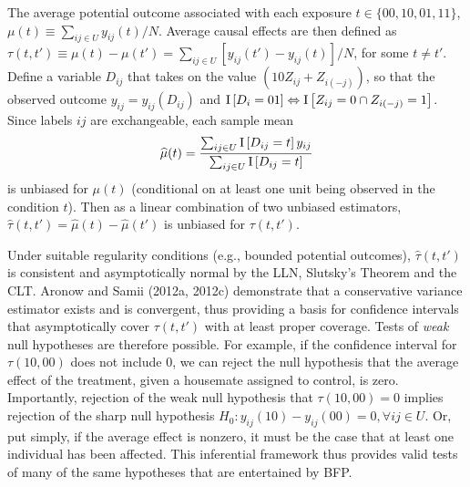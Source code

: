 \documentclass[12pt]{article}
\newcommand{\I}{{\rm I}}
\newcommand{\0}{\mathbf{0}}
\begin{document}
The average potential outcome associated with each exposure $t \in \{00,10,01,11\}$, $\mu(t) \equiv  \sum_{ij \in U} y_{ij}(t)/N$. Average causal effects are then defined as $\tau(t,t') \equiv \mu(t) - \mu(t') =
  \sum_{ij \in U} \left[y_{ij}(t') -  y_{ij}(t)\right]/N$, for some $t \neq t'$.  Define a variable $D_{ij}$ that takes on the value $(10 Z_{ij} + Z_{i(-j)})$, so that the observed outcome $y_{ij} = y_{ij}(D_{ij})$ and $\I \left[D_i = 01\right] \Leftrightarrow \I \left[Z_{ij} = 0 \cap Z_{i(-j)} = 1\right]$. Since labels $ij$ are exchangeable, each sample mean
$$
\widehat\mu(t) =\frac{\sum_{ij \in U} \I \left[D_{ij} = t\right] y_{ij} }{\sum_{ij \in U} \I \left[D_{ij} = t\right]}
$$
is unbiased for $\mu(t)$ (conditional on at least one unit being observed in the condition $t$). Then as a linear combination of two unbiased estimators, $\widehat\tau(t,t') = \widehat\mu(t) - \widehat\mu(t')$ is unbiased for $\tau(t,t')$. %

Under suitable regularity conditions (e.g., bounded potential outcomes), $\widehat\tau(t,t')$ is consistent and asymptotically normal by the LLN, Slutsky's Theorem and the CLT. Aronow and Samii (2012a, 2012c) %
demonstrate that a conservative variance estimator exists and is convergent, thus providing a basis for confidence intervals that asymptotically cover $\tau(t,t')$ with at least proper coverage.  Tests of {\it weak} null hypotheses are therefore possible. For example, if the confidence interval for $\tau(10,00)$ does not include $0$, we can reject the null hypothesis that the average effect of the treatment, given a housemate assigned to control, is zero. Importantly, rejection of the weak null hypothesis that $\tau(10,00) = 0$ implies rejection of the sharp null hypothesis $H_0: y_{ij}(10) - y_{ij}(00) = 0, \forall ij \in U$. Or, put simply, if the average effect is nonzero, it must be the case that at least one individual has been affected. This inferential framework thus provides valid tests of many of the same hypotheses that are entertained by BFP.
\end{document}
